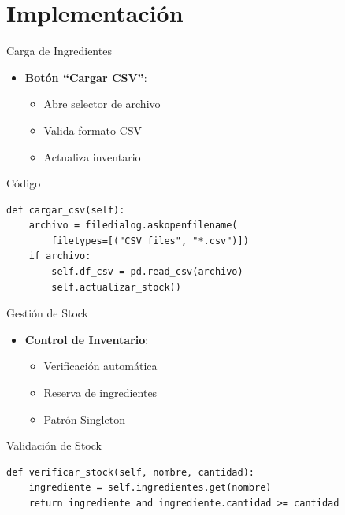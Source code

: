 \documentclass[12pt]{beamer}
\begin{document}
\section{Implementación}
\begin{frame}[fragile]{Carga de Ingredientes}
    \begin{itemize}
        \item \textbf{Botón ``Cargar CSV''}:
        \begin{itemize}
            \item Abre selector de archivo
            \item Valida formato CSV
            \item Actualiza inventario
        \end{itemize}
    \end{itemize}
    \begin{exampleblock}{Código}
        \begin{verbatim}
def cargar_csv(self):
    archivo = filedialog.askopenfilename(
        filetypes=[("CSV files", "*.csv")])
    if archivo:
        self.df_csv = pd.read_csv(archivo)
        self.actualizar_stock()
        \end{verbatim}
    \end{exampleblock}
\end{frame}

\begin{frame}[fragile]{Gestión de Stock}
    \begin{itemize}
        \item \textbf{Control de Inventario}:
        \begin{itemize}
            \item Verificación automática
            \item Reserva de ingredientes
            \item Patrón Singleton
        \end{itemize}
    \end{itemize}
    \begin{exampleblock}{Validación de Stock}
        \begin{verbatim}
def verificar_stock(self, nombre, cantidad):
    ingrediente = self.ingredientes.get(nombre)
    return ingrediente and ingrediente.cantidad >= cantidad
        \end{verbatim}
    \end{exampleblock}
\end{frame}
\end{document}
